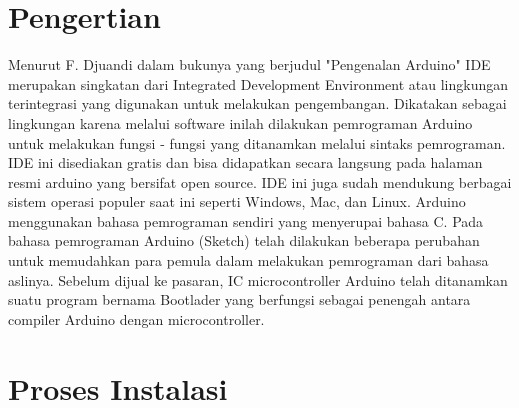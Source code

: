 ﻿	%

\section{Pengertian}


Menurut F. Djuandi dalam bukunya yang berjudul "Pengenalan Arduino" \cite{djuandi2011pengenalan} IDE merupakan singkatan dari Integrated Development Environment atau lingkungan terintegrasi yang digunakan untuk melakukan pengembangan. Dikatakan sebagai lingkungan karena melalui software inilah dilakukan pemrograman Arduino untuk melakukan fungsi - fungsi yang ditanamkan melalui sintaks pemrograman. IDE ini disediakan gratis dan bisa didapatkan secara langsung pada halaman resmi arduino yang bersifat open source. IDE ini juga sudah mendukung berbagai sistem operasi populer saat ini seperti Windows, Mac, dan Linux. Arduino menggunakan bahasa pemrograman sendiri yang menyerupai bahasa C. Pada bahasa pemrograman Arduino (Sketch) telah dilakukan beberapa perubahan untuk memudahkan para pemula dalam melakukan pemrograman dari bahasa aslinya. Sebelum dijual ke pasaran, IC microcontroller Arduino telah ditanamkan suatu program bernama Bootlader yang berfungsi sebagai penengah antara compiler Arduino dengan microcontroller.



\section{Proses Instalasi}

